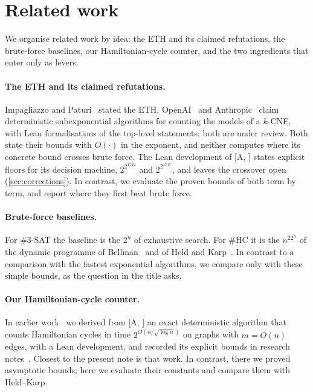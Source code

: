 \documentclass[10pt]{amsart}
\theoremstyle{definition}
\theoremstyle{remark}
\numberwithin{equation}{section}
\newcommand{\A}[1][]{\textup{[A\if\relax\detokenize{#1}\relax\else, #1\fi]}}
\newcommand{\HC}{\#\mathrm{HC}}
\begin{document}
\section{Related work}\label{sec:related}

We organise related work by idea: the ETH and its claimed refutations, the brute-force baselines,
our Hamiltonian-cycle counter, and the two ingredients that enter only as levers.

\paragraph{The ETH and its claimed refutations.} Impagliazzo and Paturi~\cite{ImpagliazzoPaturi01}
stated the ETH. OpenAI~\cite{OpenAI26} and Anthropic~\cite{Anthropic26} claim deterministic
subexponential algorithms for counting the models of a $k$-CNF, with Lean formalisations of the
top-level statements; both are under review. Both state their bounds with $O(\cdot)$ in the
exponent, and neither computes where its concrete bound crosses brute force. The Lean development
of \A{} states explicit floors for its decision machine, $2^{2^{1722}}$ and $2^{2^{1747}}$, and leaves
the crossover open (\cref{sec:corrections}). In contrast, we
evaluate the proven bounds of both term by term, and report where they first beat brute force.

\paragraph{Brute-force baselines.} For $\#3$-SAT the baseline is the $2^n$ of exhaustive search. For
$\HC$ it is the $n^22^n$ of the dynamic programme of Bellman~\cite{Bellman62} and of Held and
Karp~\cite{HeldKarp62}. In contrast to a comparison with the fastest exponential algorithms, we
compare only with these simple bounds, as the question in the title asks.

\paragraph{Our Hamiltonian-cycle counter.} In earlier work~\cite{Tulsyan26} we derived from \A{} an
exact deterministic algorithm that counts Hamiltonian cycles in time $2^{O(n/\sqrt{\log n})}$ on
graphs with $m=O(n)$ edges, with a Lean development, and recorded its explicit bounds in research
notes~\cite{TulsyanRepo26}. Closest to the present note is that work. In contrast, there we proved
asymptotic bounds; here we evaluate their constants and compare them with Held--Karp.
\end{document}
